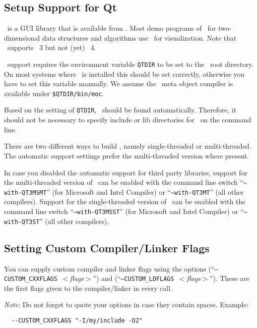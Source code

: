 \subsection{Setup Support for Qt\label{sec:qt-setup}}

\qt\ is a GUI library that is available from \qtpage. Most demo
programs of \cgal\ for two-dimensional data structures and algorithms
use \qt\ for visualization. Note that \cgal\ supports \qt~3 but not
(yet) \qt~4.

\qt\ support requires the environment variable \texttt{QTDIR} to be
set to the \qt\ root directory. On most systems where \qt\ is
installed this should be set correctly, otherwise you have to set this
variable manually. We assume the \qt\ meta object compiler is
available under \texttt{\${QTDIR}/bin/moc}.

Based on the setting of \texttt{QTDIR}, \qt\ should be found
automatically. Therefore, it should not be necessary to specify
include or lib directories for \qt\ on the command line.

There are two different ways to build \qt, namely single-threaded or
multi-threaded. The automatic support settings prefer the
multi-threaded version where present.

In case you disabled the automatic support for third party libraries,
support for the multi-threaded version of \qt\ can be enabled with the
command line switch ``\texttt{--with-QT3MSMT}'' (for Microsoft and
Intel Compiler) or ``\texttt{--with-QT3MT}'' (all other compilers).
Support for the single-threaded version of \qt\ can be enabled with
the command line switch ``\texttt{--with-QT3MSST}'' (for Microsoft and
Intel Compiler) or ``\texttt{--with-QT3ST}'' (all other compilers).

\subsection{Setting Custom Compiler/Linker Flags\label{sec:custom-setup}}

You can supply custom compiler and linker flags using the options
\mbox{(``\texttt{--CUSTOM\_CXXFLAGS}
  \textit{$<$flags$>$}'')} and
\mbox{(``\texttt{--CUSTOM\_LDFLAGS}
  \textit{$<$flags$>$}'')}. These are the
first flags given to the compiler/linker in every call.

\textit{Note:} Do not forget to quote your options in case they
contain spaces. Example:
\begin{verbatim}
  --CUSTOM_CXXFLAGS "-I/my/include -O2"
\end{verbatim}


